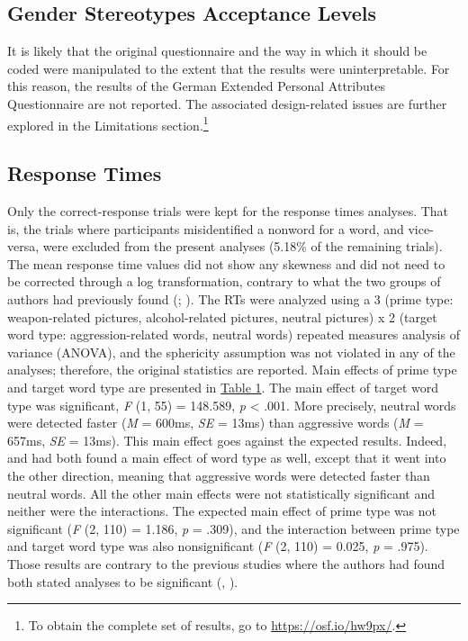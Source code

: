 \documentclass[serif, twocolumn, numeric, empirical]{jote-article}
\begin{document}
{}
\subsection*{Gender Stereotypes Acceptance Levels}
It is likely that the original questionnaire and the way in which it should be coded were manipulated to the extent that the results were uninterpretable. For this reason, the results of the German Extended Personal Attributes Questionnaire are not reported. The associated design-related issues are further explored in the Limitations section.\footnote{ To obtain the complete set of results, go to \url{https://osf.io/hw9px/}.} 

{}
\subsection*{Response Times}
Only the correct-response trials were kept for the response times analyses. That is, the trials where participants misidentified a nonword for a word, and vice-versa, were excluded from the present analyses (5.18$\%$  of the remaining trials). The mean response time values did not show any skewness and did not need to be corrected through a log transformation, contrary to what the two groups of authors had previously found (\cite{BartholowHeinz2006}; \cite{SubraMullerBegueLBushmanDelmas2010}). The RTs were analyzed using a 3 (prime type: weapon-related pictures, alcohol-related pictures, neutral pictures) x 2 (target word type: aggression-related words, neutral words) repeated measures analysis of variance (ANOVA), and the sphericity assumption was not violated in any of the analyses; therefore, the original statistics are reported. Main effects of prime type and target word type are presented in \hyperlink{table1}{Table 1}. The main effect of target word type was significant, \textit{F }(1, 55) = 148.589, \textit{p }< .001. More precisely, neutral words were detected faster (\textit{M }= 600ms, \textit{SE }= 13ms) than aggressive words (\textit{M }= 657ms, \textit{SE }= 13ms). This main effect goes against the expected results. Indeed, \textcite{BartholowHeinz2006} and \textcite{SubraMullerBegueLBushmanDelmas2010} had both found a main effect of word type as well, except that it went into the other direction, meaning that aggressive words were detected faster than neutral words. All the other main effects were not statistically significant and neither were the interactions. The expected main effect of prime type was not significant (\textit{F} (2, 110) = 1.186, \textit{p }= .309), and the interaction between prime type and target word type was also nonsignificant (\textit{F }(2, 110) = 0.025, \textit{p }= .975). Those results are contrary to the previous studies where the authors had found both stated analyses to be significant (\cite{BartholowHeinz2006}, \cite{SubraMullerBegueLBushmanDelmas2010}).
\end{document}
